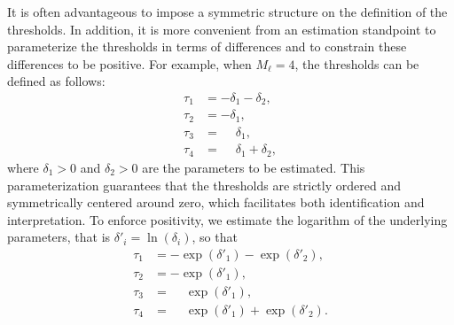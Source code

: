 \documentclass[12pt,a4paper]{article}
\begin{document}
It is often advantageous to impose a symmetric structure on the
definition of the thresholds. In addition, it is more convenient from
an estimation standpoint to parameterize the thresholds in terms of
differences and to constrain these differences to be positive. For
example, when \( M_\ell = 4 \), the thresholds can be defined as
follows:
\[
\begin{aligned}
  \tau_1 &= -\delta_1 -\delta_2, \\
  \tau_2 &= -\delta_1, \\
  \tau_3 &= \phantom{-}\delta_1, \\
  \tau_4 &= \phantom{-}\delta_1 + \delta_2,
\end{aligned}
\]
where \( \delta_1 > 0 \) and \( \delta_2 > 0 \) are the parameters to
be estimated.
This parameterization guarantees that the thresholds are strictly ordered 
and symmetrically centered around zero, which facilitates both 
identification and interpretation. To enforce positivity, we estimate the 
logarithm of the underlying parameters, that is 
$\delta'_i = \ln(\delta_i)$, so that
\[
\begin{aligned}
  \tau_1 &= -\exp(\delta'_1) - \exp(\delta'_2), \\
  \tau_2 &= -\exp(\delta'_1), \\
  \tau_3 &= \phantom{-}\exp(\delta'_1), \\
  \tau_4 &=  \phantom{-}\exp(\delta'_1) + \exp(\delta'_2).
\end{aligned}
\]
\end{document}
